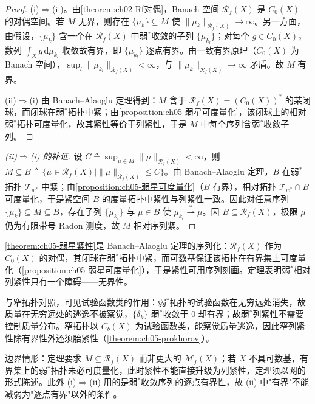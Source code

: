\documentclass[../../main.tex]{subfiles}%
\begin{document}
\begin{proof}
(i)$\Rightarrow$(ii)。由\cref{theorem:ch02-Rf对偶}，Banach 空间 $\mathscr{R}_f(X)$ 是 $C_0(X)$ 的对偶空间。若 $M$ 无界，则存在 $\{\mu_k\}\subseteq M$ 使 $\|\mu_k\|_{\mathscr{R}_f(X)}\to\infty$。另一方面，由假设，$\{\mu_k\}$ 含一个在 $\mathscr{R}_f(X)$ 中弱$^*$收敛的子列 $\{\mu_{k_l}\}$；对每个 $g\in C_0(X)$，数列 $\int_X g\,\mathrm{d}\mu_{k_l}$ 收敛故有界，即 $\{\mu_{k_l}\}$ 逐点有界。由一致有界原理（$C_0(X)$ 为 Banach 空间），$\sup_l\|\mu_{k_l}\|_{\mathscr{R}_f(X)}<\infty$，与 $\|\mu_k\|_{\mathscr{R}_f(X)}\to\infty$ 矛盾。故 $M$ 有界。

(ii)$\Rightarrow$(i) 由 Banach–Alaoglu 定理得到：$M$ 含于 $\mathscr{R}_f(X)=(C_0(X))^*$ 的某闭球，而闭球在弱$^*$拓扑中紧；由\cref{proposition:ch05-弱星可度量化}，该闭球上的相对弱$^*$拓扑可度量化，故其紧性等价于列紧性，于是 $M$ 中每个序列含弱$^*$收敛子列。
\end{proof}

\begin{proof}[(ii)$\Rightarrow$(i) 的补证]
设 $C\triangleq\sup_{\mu\in M}\|\mu\|_{\mathscr{R}_f(X)}<\infty$，则 $M\subseteq B\triangleq\{\mu\in\mathscr{R}_f(X)\mid\|\mu\|_{\mathscr{R}_f(X)}\leqslant C\}$。由 Banach–Alaoglu 定理，$B$ 在弱$^*$拓扑 $\mathcal{T}_{w^*}$ 中紧；由\cref{proposition:ch05-弱星可度量化}（$B$ 有界），相对拓扑 $\mathcal{T}_{w^*}\cap B$ 可度量化，于是紧空间 $B$ 的度量拓扑中紧性与列紧性一致。因此对任意序列 $\{\mu_k\}\subseteq M\subseteq B$，存在子列 $\{\mu_{k_l}\}$ 与 $\mu\in B$ 使 $\mu_{k_l}\stackrel{*}{\rightharpoonup}\mu$。因 $B\subseteq\mathscr{R}_f(X)$，极限 $\mu$ 仍为有限带号 Radon 测度，故 $M$ 相对序列紧。
\end{proof}

\begin{remark}\label{remark:ch05-弱星紧性动机}
\cref{theorem:ch05-弱星紧性}是 Banach–Alaoglu 定理的序列化：$\mathscr{R}_f(X)$ 作为 $C_0(X)$ 的对偶，其闭球在弱$^*$拓扑中紧，而可数基保证该拓扑在有界集上可度量化（\cref{proposition:ch05-弱星可度量化}），于是紧性可用序列刻画。定理表明弱$^*$相对列紧性只有一个障碍——无界性。

与窄拓扑对照，可见试验函数类的作用：弱$^*$拓扑的试验函数在无穷远处消失，故质量在无穷远处的逃逸不被察觉，$\{\delta_k\}$ 弱$^*$收敛于 $0$ 却有界；故弱$^*$列紧性不需要控制质量分布。窄拓扑以 $C_b(X)$ 为试验函数类，能察觉质量逃逸，因此窄列紧性除有界性外还须胎紧性（\cref{theorem:ch05-prokhorov}）。

边界情形：定理要求 $M\subseteq\mathscr{R}_f(X)$ 而非更大的 $\mathcal{M}_f(X)$；若 $X$ 不具可数基，有界集上的弱$^*$拓扑未必可度量化，此时紧性不能直接升级为列紧性，定理须以网的形式陈述。此外 (i)$\Rightarrow$(ii) 用的是弱$^*$收敛序列的逐点有界性，故 (ii) 中"有界"不能减弱为"逐点有界"以外的条件。
\end{remark}
\end{document}
